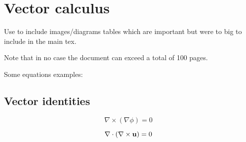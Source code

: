 \chapter{Vector calculus}
\label{chapter:appendix}

Use to include images/diagrams tables which are important but were to big to include in the main tex.

Note that in no case the document can exceed a total of 100 pages.

Some equations examples:

\section{Vector identities}
\label{section:vectorIdentities}

\begin{equation}
	\nabla \times \left( \nabla \phi \right) = 0
	\label{eq:cross_nnp}
\end{equation}

\begin{equation}
	\nabla \cdot \left( \nabla \times {\bf u} \right) = 0
	\label{eq:dotCross_nnu}
\end{equation}

\cleardoublepage


